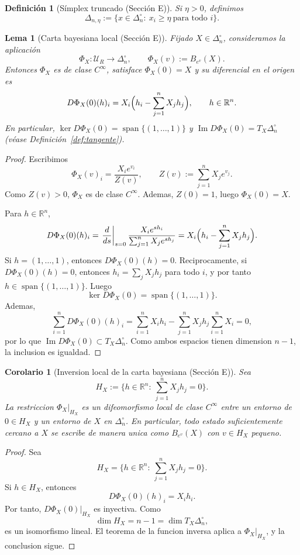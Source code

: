 ﻿\documentclass[12pt]{article}
\newcommand{\fuente}[1]{\textnormal{(#1)}}
\newtheorem{definicion}{Definición}[section]
\newtheorem{lema}{Lema}[section]
\newtheorem{corolario}{Corolario}[section]
\begin{document}
\begin{definicion}[Símplex truncado \fuente{Sección E}]
Si \(\eta>0\), definimos
\[
\Delta_{n,\eta}:=\bigl\{x\in\Delta_n^\circ:\ x_i\ge \eta\ \text{para todo }i\bigr\}.
\]
\end{definicion}

\begin{lema}[Carta bayesiana local \fuente{Sección E}]
Fijado \(X\in\Delta_n^\circ\), consideramos la aplicación
\[
\Phi_X:\mathcal U_R\to \Delta_n^\circ,
\qquad
\Phi_X(v):=B_{e^v}(X).
\]
Entonces \(\Phi_X\) es de clase \(C^\infty\), satisface \(\Phi_X(0)=X\) y su diferencial en el origen es
\[
D\Phi_X(0)(h)_i
=
X_i\Bigl(h_i-\sum_{j=1}^n X_j h_j\Bigr),
\qquad h\in\mathbb R^n.
\]
En particular, \(\ker D\Phi_X(0)=\operatorname{span}\{(1,\dots,1)\}\) y \(\operatorname{Im}D\Phi_X(0)=T_X\Delta_n^\circ\) (véase Definición~\ref{def:tangente}).
\end{lema}
\begin{proof}
Escribimos
\[
\Phi_X(v)_i=\frac{X_ie^{v_i}}{Z(v)},
\qquad
Z(v):=\sum_{j=1}^n X_je^{v_j}.
\]
Como \(Z(v)>0\), \(\Phi_X\) es de clase \(C^\infty\). Ademas, \(Z(0)=1\), luego \(\Phi_X(0)=X\).

Para \(h\in\mathbb R^n\),
\[
D\Phi_X(0)(h)_i
=
\left.\frac{d}{ds}\right|_{s=0}
\frac{X_ie^{sh_i}}{\sum_{j=1}^n X_je^{sh_j}}
=
X_i\Bigl(h_i-\sum_{j=1}^n X_jh_j\Bigr).
\]
Si \(h=(1,\dots,1)\), entonces \(D\Phi_X(0)(h)=0\). Reciprocamente, si \(D\Phi_X(0)(h)=0\), entonces \(h_i=\sum_j X_jh_j\) para todo \(i\), y por tanto \(h\in\operatorname{span}\{(1,\dots,1)\}\). Luego
\[
\ker D\Phi_X(0)=\operatorname{span}\{(1,\dots,1)\}.
\]
Ademas,
\[
\sum_{i=1}^n D\Phi_X(0)(h)_i
=
\sum_{i=1}^n X_ih_i-\sum_{j=1}^n X_jh_j\sum_{i=1}^n X_i
=
0,
\]
por lo que \(\operatorname{Im}D\Phi_X(0)\subset T_X\Delta_n^\circ\). Como ambos espacios tienen dimension \(n-1\), la inclusion es igualdad.
\end{proof}

\begin{corolario}[Inversion local de la carta bayesiana \fuente{Sección E}]
Sea
\[
H_X:=\bigl\{h\in\mathbb R^n:\ \sum_{j=1}^n X_j h_j=0\bigr\}.
\]
La restriccion \(\Phi_X|_{H_X}\) es un difeomorfismo local de clase \(C^\infty\) entre un entorno de \(0\in H_X\) y un entorno de \(X\) en \(\Delta_n^\circ\). En particular, todo estado suficientemente cercano a \(X\) se escribe de manera unica como \(B_{e^v}(X)\) con \(v\in H_X\) pequeno.
\end{corolario}
\begin{proof}
Sea
\[
H_X=\bigl\{h\in\mathbb R^n:\ \sum_{j=1}^n X_jh_j=0\bigr\}.
\]
Si \(h\in H_X\), entonces
\[
D\Phi_X(0)(h)_i=X_ih_i.
\]
Por tanto, \(D\Phi_X(0)|_{H_X}\) es inyectiva. Como
\[
\dim H_X=n-1=\dim T_X\Delta_n^\circ,
\]
es un isomorfismo lineal. El teorema de la funcion inversa aplica a \(\Phi_X|_{H_X}\), y la conclusion sigue.
\end{proof}
\end{document}
